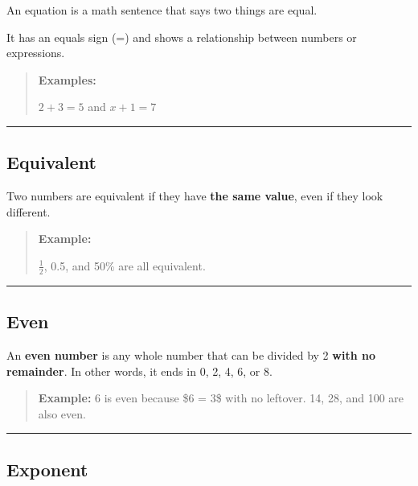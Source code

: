 \documentclass[
  letterpaper,
  DIV=11,
  numbers=noendperiod]{scrreprt}
\begin{document}
An equation is a math sentence that says two things are equal.

It has an equals sign (=) and shows a relationship between numbers or
expressions.

\begin{quote}
\textbf{Examples:}

\(2 + 3 = 5\) and \(x + 1 = 7\)
\end{quote}

\begin{center}\rule{0.5\linewidth}{0.5pt}\end{center}

\subsection*{Equivalent}\label{glossary-equivalent}

Two numbers are equivalent if they have \textbf{the same value}, even if
they look different.

\begin{quote}
\textbf{Example:}

\(\frac{1}{2}\), 0.5, and 50\% are all equivalent.
\end{quote}

\begin{center}\rule{0.5\linewidth}{0.5pt}\end{center}

\subsection*{Even}\label{glossary-even}

An \textbf{even number} is any whole number that can be divided by 2
\textbf{with no remainder}. In other words, it ends in 0, 2, 4, 6, or 8.

\begin{quote}
\textbf{Example:} 6 is even because \$6  = 3\$ with no leftover.
14, 28, and 100 are also even.
\end{quote}

\begin{center}\rule{0.5\linewidth}{0.5pt}\end{center}

\subsection*{Exponent}\label{glossary-exponent}
\end{document}
